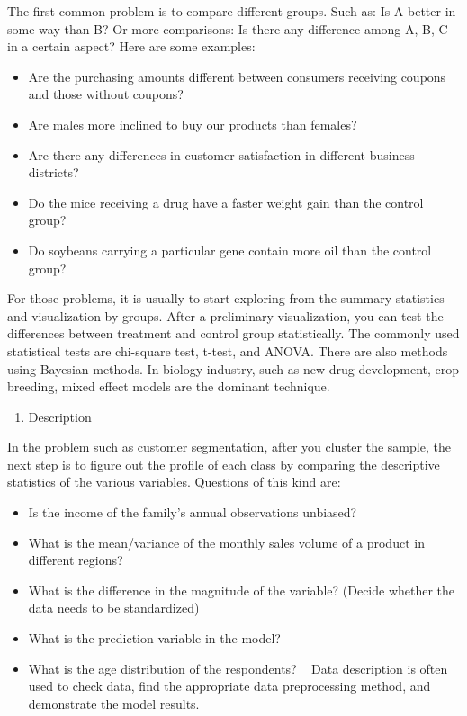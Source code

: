 \documentclass[
]{article}
\providecommand{\tightlist}{%
  \setlength{\itemsep}{0pt}\setlength{\parskip}{0pt}}
\begin{document}
The first common problem is to compare different groups. Such as: Is A
better in some way than B? Or more comparisons: Is there any difference
among A, B, C in a certain aspect? Here are some examples:

\begin{itemize}
\tightlist
\item
  Are the purchasing amounts different between consumers receiving
  coupons and those without coupons?
\item
  Are males more inclined to buy our products than females?
\item
  Are there any differences in customer satisfaction in different
  business districts?
\item
  Do the mice receiving a drug have a faster weight gain than the
  control group?
\item
  Do soybeans carrying a particular gene contain more oil than the
  control group?
\end{itemize}

For those problems, it is usually to start exploring from the summary
statistics and visualization by groups. After a preliminary
visualization, you can test the differences between treatment and
control group statistically. The commonly used statistical tests are
chi-square test, t-test, and ANOVA. There are also methods using
Bayesian methods. In biology industry, such as new drug development,
crop breeding, mixed effect models are the dominant technique.

\begin{enumerate}
\def\labelenumi{\arabic{enumi}.}
\setcounter{enumi}{1}
\tightlist
\item
  Description
\end{enumerate}

In the problem such as customer segmentation, after you cluster the
sample, the next step is to figure out the profile of each class by
comparing the descriptive statistics of the various variables. Questions
of this kind are:

\begin{itemize}
\tightlist
\item
  Is the income of the family's annual observations unbiased?
\item
  What is the mean/variance of the monthly sales volume of a product in
  different regions?
\item
  What is the difference in the magnitude of the variable? (Decide
  whether the data needs to be standardized)
\item
  What is the prediction variable in the model?
\item
  What is the age distribution of the respondents? ~ Data description is
  often used to check data, find the appropriate data preprocessing
  method, and demonstrate the model results.
\end{itemize}
\end{document}
